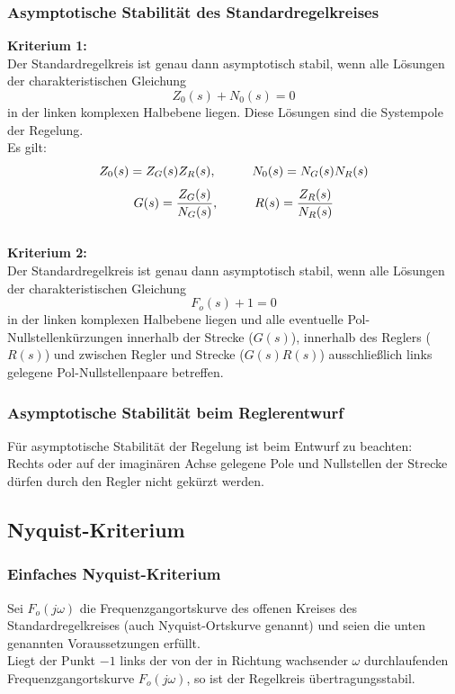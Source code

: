 \documentclass[10pt,a4paper]{article}
\newcommand{\tab}[1][1]{\hspace*{#1cm}}
\begin{document}
\subsubsection{Asymptotische Stabilität des Standardregelkreises}
\textbf{Kriterium 1:} \\
Der Standardregelkreis ist genau dann asymptotisch stabil, wenn alle Lösungen der charakteristischen Gleichung 
$$
	Z_0(s) + N_0(s) = 0
$$
in der linken  komplexen Halbebene liegen. Diese Lösungen sind die Systempole der Regelung. \\
Es gilt: 
$$
	Z_0(s) = Z_G(s)Z_R(s), \tab N_0(s) = N_G(s)N_R(s)
$$
$$
	G(s) = \frac{Z_G(s)}{N_G(s)}, \tab R(s) = \frac{Z_R(s)}{N_R(s)}
$$ \\

\textbf{Kriterium 2:} \\
Der Standardregelkreis ist genau dann asymptotisch stabil, wenn alle Lösungen der charakteristischen Gleichung
$$
	F_o(s) + 1 = 0
$$
in der linken komplexen Halbebene liegen und alle eventuelle Pol-Nullstellenkürzungen innerhalb der Strecke ($G(s)$), innerhalb des Reglers ($R(s)$) und zwischen Regler und Strecke ($G(s)R(s)$) ausschließlich links gelegene Pol-Nullstellenpaare betreffen.

\subsubsection{Asymptotische Stabilität beim Reglerentwurf}
Für asymptotische Stabilität der Regelung ist beim Entwurf zu beachten: \\
Rechts oder auf der imaginären Achse gelegene Pole und Nullstellen der Strecke dürfen durch den Regler nicht gekürzt werden.

\subsection{Nyquist-Kriterium}
\subsubsection{Einfaches Nyquist-Kriterium}
Sei $F_o(j \omega)$ die Frequenzgangortskurve des offenen Kreises des Standardregelkreises (auch Nyquist-Ortskurve genannt) und
seien die unten genannten Voraussetzungen erfüllt. \\
Liegt der Punkt $-1$ links der von der in Richtung wachsender $\omega$ durchlaufenden Frequenzgangortskurve $F_o(j \omega)$, so ist der Regelkreis übertragungsstabil. \\
\end{document}
